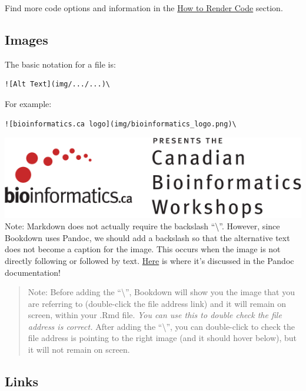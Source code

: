 \documentclass[
]{book}
\theoremstyle{definition}
\theoremstyle{definition}
\theoremstyle{definition}
\theoremstyle{definition}
\theoremstyle{remark}
\begin{document}
Find more code options and information in the \hyperref[render-code]{How to Render Code} section.

\subsection*{Images}\label{images}

The basic notation for a file is:

\begin{verbatim}
![Alt Text](img/.../...)\
\end{verbatim}

For example:

\begin{verbatim}
![bioinformatics.ca logo](img/bioinformatics_logo.png)\
\end{verbatim}

\includegraphics{img/bioinformatics_logo.png}\\

Note: Markdown does not actually require the backslash ``\textbackslash{}''. However, since Bookdown uses Pandoc, we should add a backslash so that the alternative text does not become a caption for the image. This occurs when the image is not directly following or followed by text. \href{https://pandoc.org/MANUAL.html\#extension-implicit_figures}{Here} is where it's discussed in the Pandoc documentation!

\begin{quote}
Note: Before adding the ``\textbackslash{}'', Bookdown will show you the image that you are referring to (double-click the file address link) and it will remain on screen, within your .Rmd file. \emph{You can use this to double check the file address is correct.} After adding the ``\textbackslash{}'', you can double-click to check the file address is pointing to the right image (and it should hover below), but it will not remain on screen.
\end{quote}

\subsection*{Links}\label{links}
\end{document}
